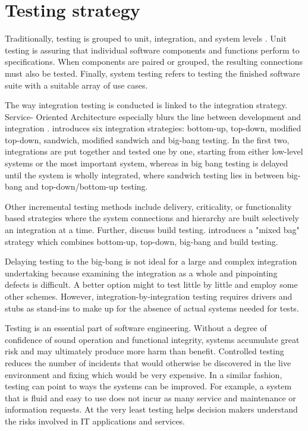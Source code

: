 \documentclass[12pt,a4paper,oneside,pdftex]{report}
\begin{document}
{%
\section{Testing strategy}
Traditionally, testing is grouped to unit, integration, and system levels \citep{jenkins2008software}. Unit testing is assuring that individual software components and functions perform to specifications. When components are paired or grouped, the resulting connections must also be tested. Finally, system testing refers to testing the finished software suite with a suitable array of use cases.

The way integration testing is conducted is linked to the integration strategy. Service-
Oriented Architecture especially blurs the line between development and integration \citep{huang2008surrogate, wieczorek2010model}. \citet{myers1976software} introduces six integration strategies: bottom-up, top-down, modified top-down, sandwich, modified sandwich and big-bang testing. In the first two, integrations are put together and tested one by one, starting from either low-level systems or the most important system, whereas in big bang testing is delayed until the system is wholly integrated, where sandwich testing lies in between big-bang and top-down/bottom-up testing.

Other incremental testing methods include delivery, criticality, or functionality based 
strategies \citep{van2008identifying} where the system connections and hierarchy are built selectively an integration at a time. Further, \citet{carey1977control} discuss build testing. \citet{beizer1984software} introduces a "mixed bag" strategy which combines bottom-up, top-down, big-bang and build testing. 

Delaying testing to the big-bang is not ideal for a large and complex integration undertaking because examining the integration as a whole and pinpointing defects is difficult. A better option might to test little by little and employ some other schemes. However, integration-by-integration testing requires drivers and stubs as stand-ins to make up for the absence of actual systems needed for tests.


Testing is an essential part of software engineering. Without a degree of confidence of sound operation and functional integrity, systems accumulate great risk and may ultimately produce more harm than benefit. Controlled testing reduces the number of incidents that would otherwise be discovered in the live environment and fixing which would be very expensive. In a similar fashion, testing can point to ways the systems can be improved. For example, a system that is fluid and easy to use does not incur as many service and maintenance or information requests. At the very least testing helps decision makers understand the risks involved in IT applications and services.

}
\end{document}
